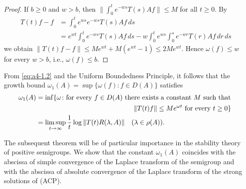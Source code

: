 \begin{proof}
\noindent
If $b \geq 0$ and $w > b$, then $\|\int_{0}^{t} e^{-w s} T(s)Af\| \leq M$ for all $t \geq 0$. 
By 
\begin{align*}
T(t)f - f &= \int_{0}^{t} e^{w s} e^{-w s} T(s)Af \, ds\\
&= e^{wt}\int_0^t e^{-ws} T(s)Af\, ds - w\int_0^te^{ws}\int_0^s e^{-wr} T(r)Af\, dr \, ds
\end{align*}
we obtain $\|T(t)f-f\| \leq Me^{w t} + M(e^{w t} - 1)
\le 2Me^{wt}$. 
Hence $\omega(f)\le w$ for every $w > b$, i.e., $\omega(f) \leq b$.
\end{proof}

\bigskip
\noindent
From \eqref{eq:a4-1.2} and the Uniform Boundedness Principle, it follows that the growth bound $\omega_{1}(A) = \sup\{\omega(f) \colon f \in D(A)\}$ satisfies
\begin{align}\label{eq:a4-1.3}
\omega_1(A) &= \inf\{\omega \colon \text{for every } f \in D(A) \text{ there exists a constant } M \text{ such that }\\
& \hskip 2 true in \|T(t)f\| \leq Me^{\omega t} \text{ for every } t \geq 0\} \notag\\
&=
\limsup_{t \to \infty} \frac{1}{t} \log\|T(t)R(\lambda,A)\| \quad (\lambda \in \rho(A)). 
\notag
\end{align}

\bigskip
\noindent
The subsequent theorem will be of particular importance in the stability theory of positive semigroups.
We show that the constant $\omega_{1}(A)$ coincides with the abscissa of simple convergence of the Laplace transform of the semigroup and with the abscissa of absolute convergence of the Laplace transform of the strong solutions of (ACP).

